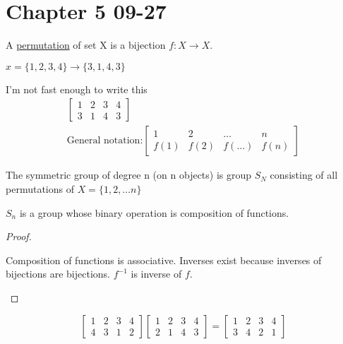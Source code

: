 \documentclass[class=scrartcl, crop=false]{standalone}
\begin{document}
\section{Chapter 5 09-27}

\begin{definition}
  A \ul{permutation} of set X is a bijection $f:X \to X$.
\end{definition}

\begin{example}
  $x = \{1, 2, 3, 4\} \to \{3, 1, 4, 3\}$
\end{example}

I'm not fast enough to write this
\begin{gather*}
  \begin{bmatrix}
    1 & 2 & 3 & 4 \\
    3 & 1 & 4 & 3
  \end{bmatrix} \\
  \text{General notation:}
  \begin{bmatrix}
    1 & 2 & \dots & n \\
    f(1) & f(2) & f(\dots) & f(n)
  \end{bmatrix}
\end{gather*}

\begin{definition}
  The symmetric group of degree n (on n objects) is group $S_N$ consisting of all permutations of $X = \{1, 2, \dots n\}$
\end{definition}

\begin{theorem}
  $S_n$ is a group whose binary operation is composition of functions.
\end{theorem}

\begin{proof}
  \begin{enumerate}
    \ii[]
    \ii
    Composition of functions is associative.
    \ii
    Inverses exist because inverses of bijections are bijections. $f^{-1}$ is inverse of $f$.
  \end{enumerate}
\end{proof}

\begin{example}
  \[
    \begin{bmatrix}
      1 & 2 & 3 & 4 \\
      4 & 3 & 1 & 2
    \end{bmatrix} 
    \begin{bmatrix}
      1 & 2 & 3 & 4 \\
      2 & 1 & 4 & 3
    \end{bmatrix} =
    \begin{bmatrix}
      1 & 2 & 3 & 4 \\
      3 & 4 & 2 & 1
    \end{bmatrix}
  \]
\end{example}
\end{document}
